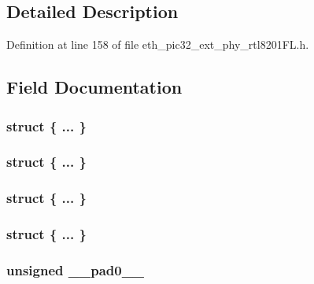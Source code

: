 \subsection{Detailed Description}


Definition at line 158 of file eth\+\_\+pic32\+\_\+ext\+\_\+phy\+\_\+rtl8201\+F\+L.\+h.



\subsection{Field Documentation}
\hypertarget{union_____a_n_a_dbits__t_a9b9b6371eb9e4951cf4964dc294dd2f5}{}\subsubsection[{"@116}]{\setlength{\rightskip}{0pt plus 5cm}struct \{ ... \} }\label{union_____a_n_a_dbits__t_a9b9b6371eb9e4951cf4964dc294dd2f5}
\hypertarget{union_____a_n_a_dbits__t_a9ffc1f0e8e907e22b1f271625b747442}{}\subsubsection[{"@118}]{\setlength{\rightskip}{0pt plus 5cm}struct \{ ... \} }\label{union_____a_n_a_dbits__t_a9ffc1f0e8e907e22b1f271625b747442}
\hypertarget{union_____a_n_a_dbits__t_a07f708ab3ba52e2dd7785aa847139b3d}{}\subsubsection[{"@188}]{\setlength{\rightskip}{0pt plus 5cm}struct \{ ... \} }\label{union_____a_n_a_dbits__t_a07f708ab3ba52e2dd7785aa847139b3d}
\hypertarget{union_____a_n_a_dbits__t_ac6f6c3366fdd06f0700e7c26e67186b3}{}\subsubsection[{"@190}]{\setlength{\rightskip}{0pt plus 5cm}struct \{ ... \} }\label{union_____a_n_a_dbits__t_ac6f6c3366fdd06f0700e7c26e67186b3}
\hypertarget{union_____a_n_a_dbits__t_adf71f3d8410c1f1dbbc96680a92c49af}{}
\subsubsection[{\+\_\+\+\_\+pad0\+\_\+\+\_\+}]{\setlength{\rightskip}{0pt plus 5cm}unsigned \+\_\+\+\_\+pad0\+\_\+\+\_\+}\label{union_____a_n_a_dbits__t_adf71f3d8410c1f1dbbc96680a92c49af}


